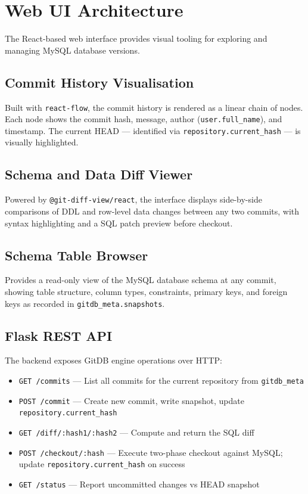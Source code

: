 \documentclass[12pt, a4paper]{article}
\begin{document}
\section{Web UI Architecture}

The React-based web interface provides visual tooling for exploring and managing
MySQL database versions.

\subsection{Commit History Visualisation}

Built with \texttt{react-flow}, the commit history is rendered as a linear
chain of nodes. Each node shows the commit hash, message, author
(\texttt{user.full\_name}), and timestamp. The current HEAD --- identified via
\texttt{repository.current\_hash} --- is visually highlighted.

\subsection{Schema and Data Diff Viewer}

Powered by \texttt{@git-diff-view/react}, the interface displays side-by-side
comparisons of DDL and row-level data changes between any two commits, with
syntax highlighting and a SQL patch preview before checkout.

\subsection{Schema Table Browser}

Provides a read-only view of the MySQL database schema at any commit, showing
table structure, column types, constraints, primary keys, and foreign keys as
recorded in \texttt{gitdb\_meta.snapshots}.

\subsection{Flask REST API}

The backend exposes GitDB engine operations over HTTP:

\begin{itemize}[leftmargin=1.5em, itemsep=0.3em]
    \item \texttt{GET /commits} --- List all commits for the current repository
    from \texttt{gitdb\_meta}
    \item \texttt{POST /commit} --- Create new commit, write snapshot, update
    \texttt{repository.current\_hash}
    \item \texttt{GET /diff/:hash1/:hash2} --- Compute and return the SQL diff
    \item \texttt{POST /checkout/:hash} --- Execute two-phase checkout against
    MySQL; update \texttt{repository.current\_hash} on success
    \item \texttt{GET /status} --- Report uncommitted changes vs HEAD snapshot
\end{itemize}
\end{document}

